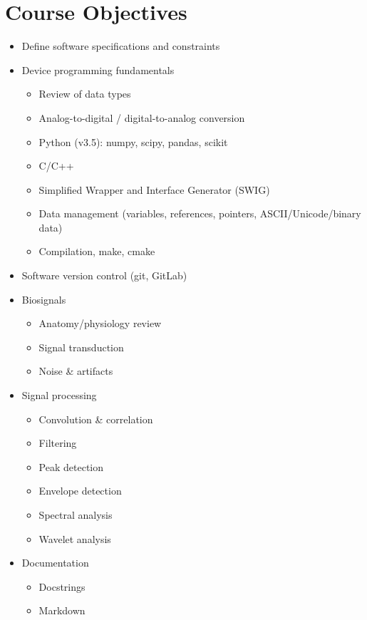 \section*{Course Objectives}
\begin{multicols}{2}
\begin{itemize}
    \item Define software specifications and constraints
    \item Device programming fundamentals
    \begin{itemize}
        \item Review of data types
        \item Analog-to-digital / digital-to-analog conversion
        \item Python (v3.5): numpy, scipy, pandas, scikit
        \item C/C++
        \item Simplified Wrapper and Interface Generator (SWIG)
        \item Data management (variables, references, pointers, ASCII/Unicode/binary data)
        \item Compilation, make, cmake
    \end{itemize}
    \item Software version control (git, GitLab)
    \item Biosignals
    \begin{itemize}
        \item Anatomy/physiology review
        \item Signal transduction
        \item Noise \& artifacts
    \end{itemize}
    \item Signal processing
    \begin{itemize}
        \item Convolution \& correlation
        \item Filtering
        \item Peak detection
        \item Envelope detection
        \item Spectral analysis
        \item Wavelet analysis
    \end{itemize}
    \item Documentation
    \begin{itemize}
        \item Docstrings
        \item Markdown

\end{itemize}
\end{itemize}
\end{multicols}
